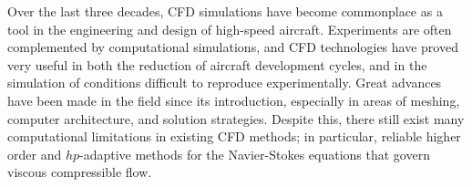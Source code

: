 

Over the last three decades, CFD simulations have become commonplace as a tool in the engineering and design of high-speed aircraft.  Experiments are often complemented by computational simulations, and CFD technologies have proved very useful in both the reduction of aircraft development cycles, and in the simulation of conditions difficult to reproduce experimentally.  Great advances have been made in the field since its introduction, especially in areas of meshing, computer architecture, and solution strategies.  Despite this, there still exist many computational limitations in existing CFD methods; in particular, reliable higher order and $hp$-adaptive methods for the Navier-Stokes equations that govern viscous compressible flow.

